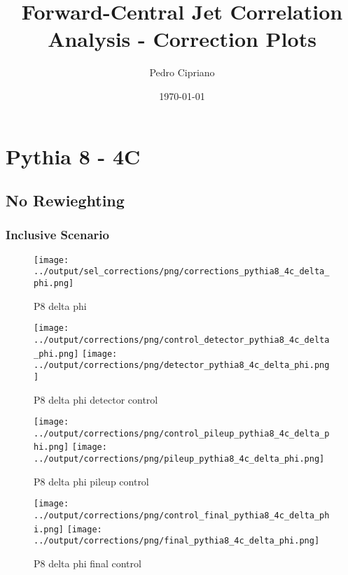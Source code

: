 \documentclass[11pt]{book}
\begin{document}
         
 
 \author{Pedro Cipriano}
 \date{\today}
 \title{Forward-Central Jet Correlation Analysis - Correction Plots}

\maketitle

\clearpage

\tableofcontents

\cleardoublepage

\chapter{Pythia 8 - 4C}

\section{No Rewieghting}

\subsection{Inclusive Scenario}
\begin{figure}[ht]
\centering
\texttt{[image: ../output/sel\_corrections/png/corrections\_pythia8\_4c\_delta\_phi.png]}
\caption{P8 delta phi}
\label{fig:p8_delta_phi}
\end{figure}

\begin{figure}[ht]
\centering
\texttt{[image: ../output/corrections/png/control\_detector\_pythia8\_4c\_delta\_phi.png]}
\texttt{[image: ../output/corrections/png/detector\_pythia8\_4c\_delta\_phi.png]}
\caption{P8 delta phi detector control}
\label{fig:p8_delta_phi_detector_control}
\end{figure}

\begin{figure}[ht]
\centering
\texttt{[image: ../output/corrections/png/control\_pileup\_pythia8\_4c\_delta\_phi.png]}
\texttt{[image: ../output/corrections/png/pileup\_pythia8\_4c\_delta\_phi.png]}
\caption{P8 delta phi pileup control}
\label{fig:p8_delta_phi_pileup_control}
\end{figure}


\begin{figure}[ht]
\centering
\texttt{[image: ../output/corrections/png/control\_final\_pythia8\_4c\_delta\_phi.png]}
\texttt{[image: ../output/corrections/png/final\_pythia8\_4c\_delta\_phi.png]}
\caption{P8 delta phi final control}
\label{fig:p8_delta_phi_final_control}
\end{figure}
\end{document}
